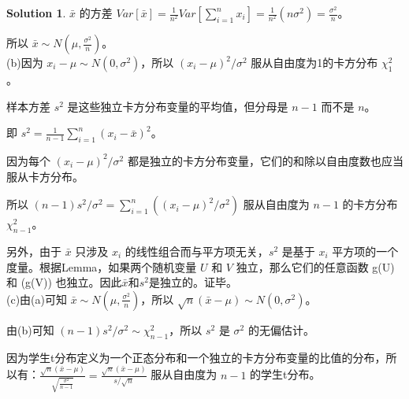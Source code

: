 \documentclass[a4paper,UTF8]{article}
\numberwithin{equation}{section}
\theoremstyle{definition}
\newtheorem*{solution}{Solution}
\begin{document}
\begin{solution}
$\bar{x}$ 的方差 $Var[\bar{x}] = \frac{1}{n^2} Var[\sum_{i=1}^{n} x_i] = \frac{1}{n^2}(n\sigma^2) = \frac{\sigma^2}{n}$。

所以 $\bar{x} \sim N(\mu, \frac{\sigma^2}{n})$。\\
    (b)因为 $x_i - \mu \sim N(0, \sigma^2)$，所以 $(x_i - \mu)^2/\sigma^2$ 服从自由度为1的卡方分布 $\chi^2_1$。

样本方差 $s^2$ 是这些独立卡方分布变量的平均值，但分母是 $n-1$ 而不是 $n$。

即 $s^2 = \frac{1}{n-1}\sum_{i=1}^{n}(x_i - \bar{x})^2$。

因为每个 $(x_i - \mu)^2/\sigma^2$ 都是独立的卡方分布变量，它们的和除以自由度数也应当服从卡方分布。

所以 $(n-1)s^2/\sigma^2 = \sum_{i=1}^{n}((x_i - \mu)^2/\sigma^2)$ 服从自由度为 $n-1$ 的卡方分布 $\chi^2_{n-1}$。

另外，由于 $\bar{x}$ 只涉及 $x_i$ 的线性组合而与平方项无关，$s^2$ 是基于 $x_i$ 平方项的一个度量。根据Lemma，如果两个随机变量 $U$ 和 $V$ 独立，那么它们的任意函数 g(U) 和 (g(V)) 也独立。因此$\bar{x}$和$s^2$是独立的。证毕。\\
    (c)由(a)可知 $\bar{x} \sim N(\mu, \frac{\sigma^2}{n})$，所以 $\sqrt{n}(\bar{x}-\mu) \sim N(0, \sigma^2)$。

由(b)可知 $(n-1)s^2/\sigma^2 \sim \chi^2_{n-1}$，所以 $s^2$ 是 $\sigma^2$ 的无偏估计。

因为学生t分布定义为一个正态分布和一个独立的卡方分布变量的比值的分布，所以有：$\frac{\sqrt{n}(\bar{x}-\mu)}{\sqrt{\frac{\sigma^2}{n-1}}} = \frac{\sqrt{n}(\bar{x}-\mu)}{s/\sqrt{n}}$ 服从自由度为 $n-1$ 的学生t分布。
\end{solution}


\newpage
\end{document}
